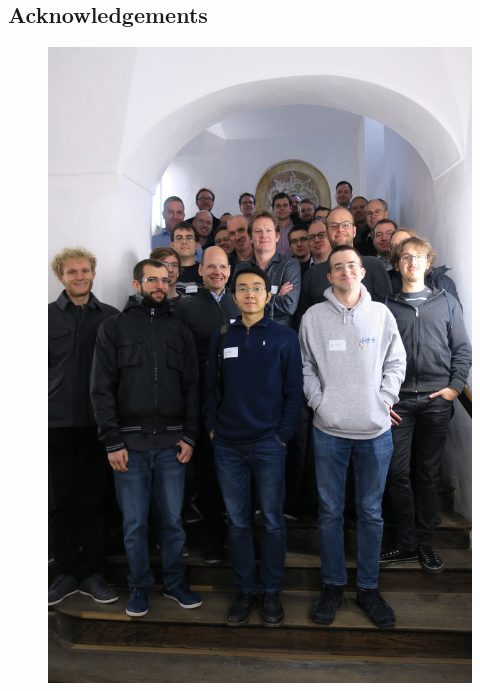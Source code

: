
\subsection*{Acknowledgements}\label{sec:acknowledgement}

\begin{figure}[t!]
\includegraphics[width=\columnwidth]{figures/group-photo-scaled}
\end{figure}


